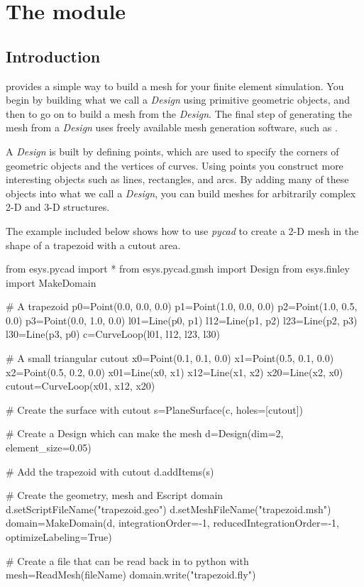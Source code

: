 \chapter{The module \pycad} \label{PYCAD CHAP}


\section{Introduction}

\pycad provides a simple way to build a mesh for your finite element
simulation.  You begin by building what we call a {\it Design} using
primitive geometric objects, and then to go on to build a mesh from
the {\it Design}.  The final step of generating the mesh from a {\it
Design} uses freely available mesh generation software, such as \gmshextern.

A {\it Design} is built by defining points, which are used to specify
the corners of geometric objects and the vertices of curves.  Using
points you construct more interesting objects such as lines,
rectangles, and arcs.  By adding many of these objects into what we
call a {\it Design}, you can build meshes for arbitrarily complex 2-D
and 3-D structures.

The example included below shows how to use {\it pycad} to create a 2-D mesh
in the shape of a trapezoid with a cutout area.

\begin{python}
	from esys.pycad import *
	from esys.pycad.gmsh import Design
	from esys.finley import MakeDomain

	# A trapezoid
	p0=Point(0.0, 0.0, 0.0)
	p1=Point(1.0, 0.0, 0.0)
	p2=Point(1.0, 0.5, 0.0)
	p3=Point(0.0, 1.0, 0.0)
	l01=Line(p0, p1)
	l12=Line(p1, p2)
	l23=Line(p2, p3)
	l30=Line(p3, p0)
	c=CurveLoop(l01, l12, l23, l30)

	# A small triangular cutout
	x0=Point(0.1, 0.1, 0.0)
	x1=Point(0.5, 0.1, 0.0)
	x2=Point(0.5, 0.2, 0.0)
	x01=Line(x0, x1)
	x12=Line(x1, x2)
	x20=Line(x2, x0)
	cutout=CurveLoop(x01, x12, x20)

	# Create the surface with cutout
	s=PlaneSurface(c, holes=[cutout])

	# Create a Design which can make the mesh
	d=Design(dim=2, element_size=0.05)

	# Add the trapezoid with cutout
	d.addItems(s)

	# Create the geometry, mesh and Escript domain
	d.setScriptFileName("trapezoid.geo")
	d.setMeshFileName("trapezoid.msh")
	domain=MakeDomain(d, integrationOrder=-1, reducedIntegrationOrder=-1, optimizeLabeling=True)

	# Create a file that can be read back in to python with mesh=ReadMesh(fileName)
	domain.write("trapezoid.fly")
\end{python}

